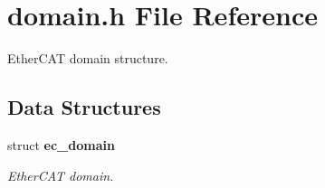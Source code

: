 \section{domain.\-h File Reference}
\label{domain_8h}


Ether\-C\-A\-T domain structure.  


\subsection*{Data Structures}
\begin{DoxyCompactItemize}
\item 
struct {\bf ec\-\_\-domain}
\begin{DoxyCompactList}\small\item\em Ether\-C\-A\-T domain. \end{DoxyCompactList}\end{DoxyCompactItemize}
